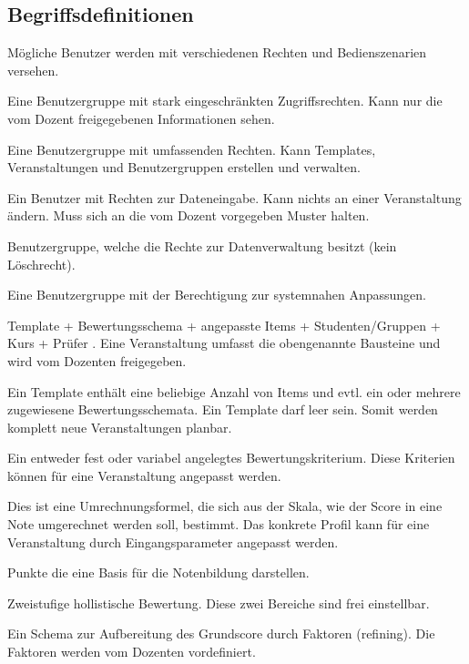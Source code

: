  \begin{appendix}
  \section{Begriffsdefinitionen}
	\begin{description}
	\item[Benutzergruppen] Mögliche Benutzer werden mit verschiedenen Rechten und Bedienszenarien versehen.
	\item[Student] Eine Benutzergruppe mit stark eingeschränkten Zugriffsrechten. Kann nur die vom Dozent freigegebenen Informationen sehen.
	\item[Dozent] Eine Benutzergruppe mit umfassenden Rechten. Kann Templates, Veranstaltungen und Benutzergruppen erstellen und verwalten.
	\item[Prüfer] Ein Benutzer mit Rechten zur Dateneingabe. Kann nichts an einer Veranstaltung ändern. Muss sich an die vom Dozent vorgegeben Muster halten.
	\item[Sekretariat] Benutzergruppe, welche die Rechte zur Datenverwaltung besitzt (kein Löschrecht).
	\item[Administrator] Eine Benutzergruppe mit der Berechtigung zur systemnahen Anpassungen.
	\item[Veranstaltung] Template + Bewertungsschema + angepasste Items + Studenten/Gruppen + Kurs + Prüfer . Eine Veranstaltung umfasst die obengenannte Bausteine und wird vom Dozenten freigegeben. 
	\item[Template] Ein Template enthält eine beliebige Anzahl von Items und evtl. ein oder mehrere zugewiesene Bewertungsschemata. Ein Template darf leer sein. Somit werden komplett neue Veranstaltungen planbar.
	\item[Item] Ein entweder fest oder variabel angelegtes Bewertungskriterium. Diese Kriterien können für eine Veranstaltung angepasst werden.
	\item[{\parbox[t]{0.2\linewidth}{Notenkonvertierungsprofil \\ (S$_2$G)}}] {\parbox[t]{\linewidth}{ Dies ist eine Umrechnungsformel, die sich aus der Skala, wie der Score in eine Note umgerechnet werden soll, bestimmt. Das konkrete Profil kann für eine Veranstaltung durch Eingangsparameter angepasst werden.}}
	\item[Score] Punkte die eine Basis für die Notenbildung darstellen.
	\item[Grundscore (H$_2$)]  Zweistufige hollistische Bewertung. Diese zwei Bereiche sind frei einstellbar.
	\item[Score Refining (S$_2$R)]  Ein Schema zur Aufbereitung des Grundscore durch Faktoren (refining). Die Faktoren werden vom Dozenten vordefiniert.
	

\end{description}
\end{appendix}
